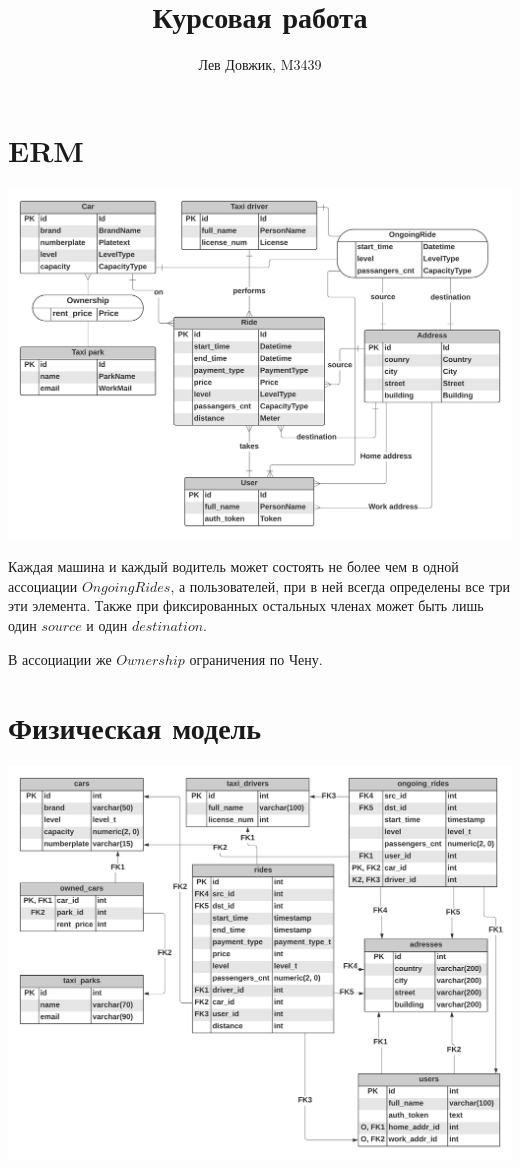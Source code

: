 \documentclass[fontsize=12pt]{article}
\title{Курсовая работа}
\author{Лев Довжик, M3439}
\date{}
\begin{document}
	\maketitle
	
\section{ERM}

\includegraphics[scale=0.72]{Taxi.png}

Каждая машина и каждый водитель может состоять не более чем в одной ассоциации $OngoingRides$, а пользователей, при в ней всегда определены все три эти элемента. Также при фиксированных остальных членах может быть лишь один $source$ и один $destination$.

В ассоциации же $Ownership$ ограничения по Чену.

\section{Физическая модель}

\includegraphics[scale=0.7]{Taxi_phys.png}
\end{document}
